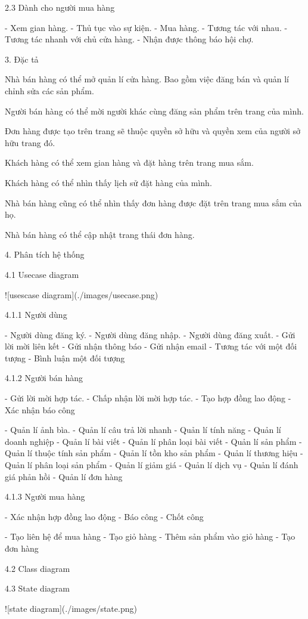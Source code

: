 \documentclass{report}
\begin{document}
2.3 Dành cho người mua hàng

- Xem gian hàng.
- Thủ tục vào sự kiện.
- Mua hàng.
- Tương tác với nhau.
- Tương tác nhanh với chủ cửa hàng.
- Nhận được thông báo hội chợ.

3. Đặc tả

Nhà bán hàng có thể mở quản lí cửa hàng. Bao gồm việc đăng bán và quản lí chỉnh sửa các sản phẩm.

Người bán hàng có thể mời người khác cùng đăng sản phẩm trên trang của mình.

Đơn hàng được tạo trên trang sẽ thuộc quyền sở hữu và quyền xem của người sở hữu trang đó.

Khách hàng có thể xem gian hàng và đặt hàng trên trang mua sắm.

Khách hàng có thể nhìn thấy lịch sử đặt hàng của mình.

Nhà bán hàng cũng có thể nhìn thấy đơn hàng được đặt trên trang mua sắm của họ.

Nhà bán hàng có thể cập nhật trang thái đơn hàng.

4. Phân tích hệ thống

4.1 Usecase diagram

![usescase diagram](./images/usecase.png)

4.1.1 Người dùng

- Người dùng đăng ký.
- Người dùng đăng nhập.
- Người dùng đăng xuất.
- Gửi lời mời liên kết
- Gửi nhận thông báo
- Gửi nhận email
- Tương tác với một đối tượng
- Bình luận một đối tượng

4.1.2 Người bán hàng

- Gửi lời mời hợp tác.
- Chấp nhận lời mời hợp tác.
- Tạo hợp đồng lao động
- Xác nhận báo công

- Quản lí ảnh bìa.
- Quản lí câu trả lời nhanh
- Quản lí tính năng
- Quản lí doanh nghiệp
- Quản lí bài viết
- Quản lí phân loại bài viết
- Quản lí sản phẩm
- Quản lí thuộc tính sản phẩm
- Quản lí tồn kho sản phẩm
- Quản lí thương hiệu
- Quản lí phân loại sản phẩm
- Quản lí giảm giá
- Quản lí dịch vụ
- Quản lí đánh giá phản hồi
- Quản lí đơn hàng

4.1.3 Người mua hàng

- Xác nhận hợp đồng lao động
- Báo công
- Chốt công

- Tạo liên hệ để mua hàng
- Tạo giỏ hàng
- Thêm sản phẩm vào giỏ hàng
- Tạo đơn hàng

4.2 Class diagram

4.3 State diagram

![state diagram](./images/state.png)
\end{document}
